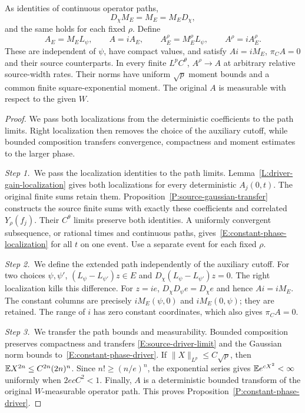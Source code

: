 \begin{proposition}\label{P:constant-phase-driver}
  As identities of continuous operator paths,
  \begin{equation}\label{E:constant-phase-localization}
    D_\chi M_E=M_E=M_ED_\chi,
  \end{equation}
  and the same holds for each fixed $\rho$. Define
  \begin{equation}\label{E:constant-phase-driver}
    A_E=M_EL_\psi,\qquad A=iA_E,\qquad
    A_E^\rho=M_E^\rho L_\psi,\qquad A^\rho=iA_E^\rho.
  \end{equation}
  These are independent of $\psi$, have compact values, and satisfy $Ai = iM_E$,
  $\pi_CA = 0$ and their source counterparts. In every finite $L^pC^\theta$,
  $A^\rho \to A$ at arbitrary relative source-width rates. Their norms have
  uniform $\sqrt p$ moment bounds and a common finite square-exponential moment.
  The original $A$ is measurable with respect to the given $W$.
\end{proposition}

\begin{proof}
  We pass both localizations from the deterministic coefficients to the path
  limits. Right localization then removes the choice of the auxiliary cutoff,
  while bounded composition transfers convergence, compactness and moment
  estimates to the larger phase.

  \medskip
  \noindent\textit{Step 1.~}We pass the localization identities to the path
  limits.
  Lemma~\ref{L:driver-gain-localization} gives both localizations for every
  deterministic $A_j(0,t)$. The original finite sums retain them.
  Proposition~\ref{P:source-gaussian-transfer} constructs the source finite sums
  with exactly these coefficients and correlated $Y_\rho(f_j)$. Their $C^\theta$
  limits preserve both identities. A uniformly convergent subsequence, or
  rational times and continuous paths,
  gives~\eqref{E:constant-phase-localization} for all $t$ on one event. Use a
  separate event for each fixed $\rho$.


  \medskip
  \noindent\textit{Step 2.~}We define the extended path independently of the
  auxiliary cutoff.
  For two choices $\psi,\psi'$, $(L_\psi-L_{\psi'})z \in E$ and
  $D_\chi(L_\psi-L_{\psi'})z = 0$. The right localization kills this difference.
  For $z = ie$, $D_\chi D_\psi e = D_\chi e$ and hence $Ai = iM_E$. The constant
  columns are precisely $iM_E(\psi,0)$ and $iM_E(0,\psi)$; they are retained.
  The range of $i$ has zero
  constant coordinates, which also gives $\pi_C A = 0$.

  \medskip
  \noindent\textit{Step 3.~}We transfer the path bounds and measurability.
  Bounded composition preserves compactness and transfers
  \eqref{E:source-driver-limit} and the Gaussian norm bounds
  to~\eqref{E:constant-phase-driver}. If $\|X\|_{L^p} \le C\sqrt p$, then $\mathbb{E}
  X^{2n} \le C^{2n}(2n)^n$. Since $n! \ge (n/e)^n$, the exponential series gives
  $\mathbb{E} e^{cX^2} < \infty$ uniformly when $2ecC^2 < 1$. Finally, $A$ is a
  deterministic bounded transform of the original $W$-measurable operator path.
  This proves Proposition~\ref{P:constant-phase-driver}.
\end{proof}

